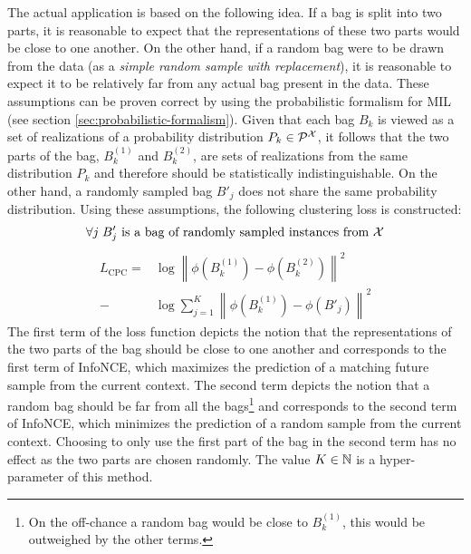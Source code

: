 The actual application is based on the following idea. If a bag is split into two parts, it is reasonable to expect that the representations of these two parts would be close to one another. On the other hand, if a random bag were to be drawn from the data (as a \textit{simple random sample with replacement}), it is reasonable to expect it to be relatively far from any actual bag present in the data. These assumptions can be proven correct by using the probabilistic formalism for MIL (see section \ref{sec:probabilistic-formalism}). Given that each bag \( B_k \) is viewed as a set of realizations of a probability distribution \( P_k \in \mathcal{P}^\mathspace{X} \), it follows that the two parts of the bag, \( B_k^{(1)} \) and \( B_k^{(2)} \), are sets of realizations from the same distribution \( P_k \) and therefore should be statistically indistinguishable. On the other hand, a randomly sampled bag \( B'_j \) does not share the same probability distribution.
Using these assumptions, the following clustering loss is constructed:
\[ \forall j \; B'_j \text{ is a bag of randomly sampled instances from } \mathcal{X} \]
\begin{align*}
	L_\mathrm{CPC} = &\log \left\lVert \phi \left( B_k^{(1)} \right) - \phi \left( B_k^{(2)} \right) \right\rVert^2 \\
	- &\log \sum_{j = 1}^K \left\lVert \phi \left( B_k^{(1)} \right) - \phi \left( B'_j \right) \right\rVert^2
\end{align*}
The first term of the loss function depicts the notion that the representations of the two parts of the bag should be close to one another and corresponds to the first term of InfoNCE, which maximizes the prediction of a matching future sample from the current context. The second term depicts the notion that a random bag should be far from all the bags\footnote{On the off-chance a random bag would be close to \( B_k^{(1)} \), this would be outweighed by the other terms.} and corresponds to the second term of InfoNCE, which minimizes the prediction of a random sample from the current context. Choosing to only use the first part of the bag in the second term has no effect as the two parts are chosen randomly. The value \( K \in \mathbb{N} \) is a hyper-parameter of this method.


